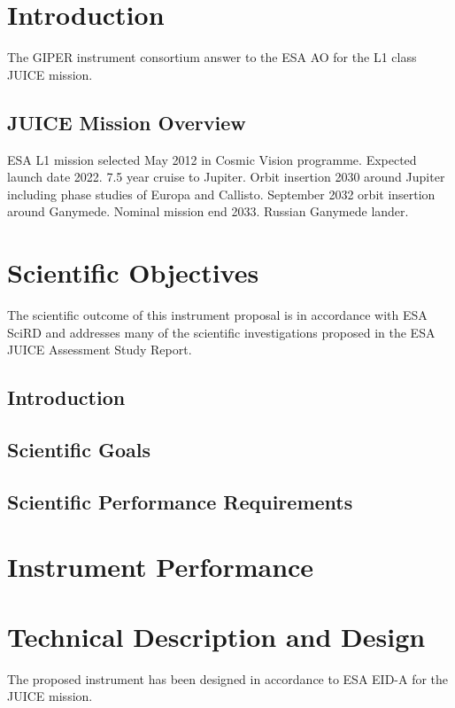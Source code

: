 \section{Introduction}
\label{sec:introduction}
%
The GIPER instrument consortium answer to the ESA \ac{AO}\cite{JUICE_AO} for the L1 class \ac{JUICE} mission.
%
%
\subsection{JUICE Mission Overview}
ESA L1 mission selected May 2012 in Cosmic Vision programme. Expected launch date 2022. 7.5 year cruise to Jupiter. Orbit insertion 2030 around Jupiter including phase studies of Europa and Callisto. September 2032 orbit insertion around Ganymede. Nominal mission end 2033. Russian Ganymede lander.
%
%
\section{Scientific Objectives}
%
The scientific outcome of this instrument proposal is in accordance with ESA \ac{SciRD}\cite{SciRD} and addresses many of the scientific investigations proposed in the ESA JUICE Assessment Study Report\cite{yellowbook}.
%
%
\subsection{Introduction}
\subsection{Scientific Goals}
\subsection{Scientific Performance Requirements}
% 
%
\section{Instrument Performance}
%

\section{Technical Description and Design}
%
The proposed instrument has been designed in accordance to ESA \ac{EID-A} for the \ac{JUICE} mission\cite{EIDA}.
%
